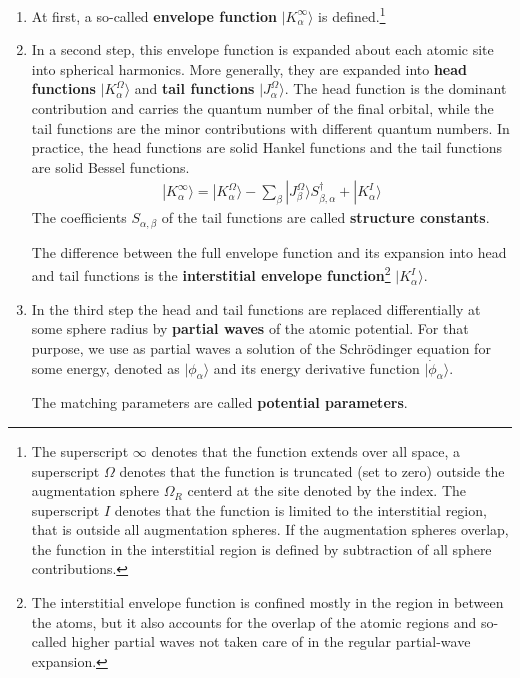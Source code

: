 \documentclass[11pt,a4paper]{report}
\begin{document}
\begin{enumerate}
\item At first, a so-called \textbf{envelope function} $|K^\infty_\alpha\rangle$ is defined.\footnote{The
  superscript $\infty$ denotes that the function extends over all
  space, a superscript $\Omega$ denotes that the function is truncated
  (set to zero) outside the augmentation sphere $\Omega_{R}$ centerd
  at the site denoted by the index. The superscript $I$ denotes that
  the function is limited to the interstitial region, that is outside
  all augmentation spheres. If the augmentation spheres overlap, the
  function in the interstitial region is defined by subtraction of all
  sphere contributions.}
%
\item In a second step, this envelope function is expanded about each
  atomic site into spherical harmonics.  More generally, they are
  expanded into \textbf{head functions}
  $|K^\Omega_\alpha\rangle$ and \textbf{tail functions} $|J^\Omega_\alpha\rangle$. The head function is the
  dominant contribution and carries the quantum number of the final
  orbital, while the tail functions are the minor contributions with
  different quantum numbers. In practice, the head functions are solid
  Hankel functions and the tail functions are solid Bessel functions.
\begin{eqnarray}
|K_{\alpha}^\infty\rangle=|K^\Omega_{\alpha}\rangle
-\sum_{\beta}|J^\Omega_{\beta}\rangle S^\dagger_{\beta,\alpha}
+|K^I_{\alpha}\rangle
\end{eqnarray}
   The coefficients $S_{\alpha,\beta}$ of the tail functions are
   called \textbf{structure constants}.

  The difference between the full envelope function and its expansion
  into head and tail functions is the \textbf{interstitial envelope
    function}\footnote{The
    interstitial envelope function is confined mostly in the region in
    between the atoms, but it also accounts for the overlap of the
    atomic regions and so-called higher partial waves not taken care of
    in the regular partial-wave expansion.}  $|K^I_\alpha\rangle$.
%
\item In the third step the head and tail functions are replaced
  differentially at some sphere radius by \textbf{partial
    waves} of the atomic potential. For that
  purpose, we use as partial waves a solution of the Schr\"odinger
  equation for some energy, denoted as $|\phi_{\alpha}\rangle$ and its
  energy derivative function $|\dot{\phi}_\alpha\rangle$.

  The matching parameters are called \textbf{potential
    parameters}.
\end{enumerate}
\end{document}
